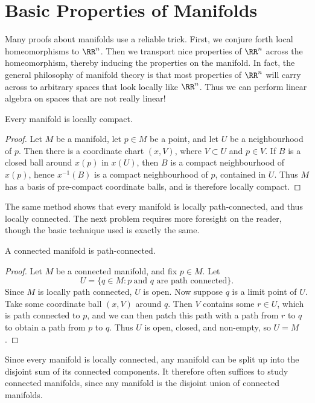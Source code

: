 \section{Basic Properties of Manifolds}

Many proofs about manifolds use a reliable trick. First, we conjure forth local homeomorphisms to $\RR^n$. Then we transport nice properties of $\RR^n$ across the homeomorphism, thereby inducing the properties on the manifold. In fact, the general philosophy of manifold theory is that most properties of $\RR^n$ will carry across to arbitrary spaces that look locally like $\RR^n$. Thus we can perform linear algebra on spaces that are not really linear!

\begin{theorem}
    Every manifold is locally compact.
\end{theorem}
\begin{proof}
    Let $M$ be a manifold, let $p \in M$ be a point, and let $U$ be a neighbourhood of $p$. Then there is a coordinate chart $(x,V)$, where $V \subset U$ and $p \in V$. If $B$ is a closed ball around $x(p)$ in $x(U)$, then $B$ is a compact neighbourhood of $x(p)$, hence $x^{-1}(B)$ is a compact neighbourhood of $p$, contained in $U$. Thus $M$ has a basis of pre-compact coordinate balls, and is therefore locally compact.
\end{proof}

The same method shows that every manifold is locally path-connected, and thus locally connected. The next problem requires more foresight on the reader, though the basic technique used is exactly the same.

\begin{theorem}
    A connected manifold is path-connected.
\end{theorem}
\begin{proof}
    Let $M$ be a connected manifold, and fix $p \in M$. Let
    \[ U = \{ q \in M: p\ \text{and $q$ are path connected} \}. \]
    Since $M$ is locally path connected, $U$ is open. Now suppose $q$ is a limit point of $U$. Take some coordinate ball $(x,V)$ around $q$. Then $V$ contains some $r \in U$, which is path connected to $p$, and we can then patch this path with a path from $r$ to $q$ to obtain a path from $p$ to $q$. Thus $U$ is open, closed, and non-empty, so $U = M$.
\end{proof}

Since every manifold is locally connected, any manifold can be split up into the disjoint sum of its connected components. It therefore often suffices to study connected manifolds, since any manifold is the disjoint union of connected manifolds.

